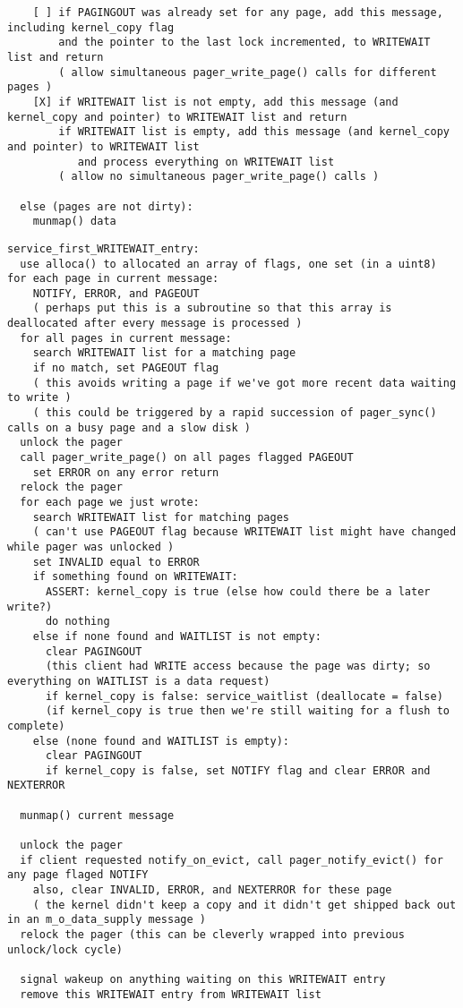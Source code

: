 \documentclass{article}
\begin{document}
\begin{verbatim}
    [ ] if PAGINGOUT was already set for any page, add this message, including kernel_copy flag
        and the pointer to the last lock incremented, to WRITEWAIT list and return
        ( allow simultaneous pager_write_page() calls for different pages )
    [X] if WRITEWAIT list is not empty, add this message (and kernel_copy and pointer) to WRITEWAIT list and return
        if WRITEWAIT list is empty, add this message (and kernel_copy and pointer) to WRITEWAIT list
           and process everything on WRITEWAIT list
        ( allow no simultaneous pager_write_page() calls )

  else (pages are not dirty):
    munmap() data
\end{verbatim}

\begin{verbatim}
service_first_WRITEWAIT_entry:
  use alloca() to allocated an array of flags, one set (in a uint8) for each page in current message:
    NOTIFY, ERROR, and PAGEOUT
    ( perhaps put this is a subroutine so that this array is deallocated after every message is processed )
  for all pages in current message:
    search WRITEWAIT list for a matching page
    if no match, set PAGEOUT flag
    ( this avoids writing a page if we've got more recent data waiting to write )
    ( this could be triggered by a rapid succession of pager_sync() calls on a busy page and a slow disk )
  unlock the pager
  call pager_write_page() on all pages flagged PAGEOUT
    set ERROR on any error return
  relock the pager
  for each page we just wrote:
    search WRITEWAIT list for matching pages
    ( can't use PAGEOUT flag because WRITEWAIT list might have changed while pager was unlocked )
    set INVALID equal to ERROR
    if something found on WRITEWAIT:
      ASSERT: kernel_copy is true (else how could there be a later write?)
      do nothing
    else if none found and WAITLIST is not empty:
      clear PAGINGOUT
      (this client had WRITE access because the page was dirty; so everything on WAITLIST is a data request)
      if kernel_copy is false: service_waitlist (deallocate = false)
      (if kernel_copy is true then we're still waiting for a flush to complete)
    else (none found and WAITLIST is empty):
      clear PAGINGOUT
      if kernel_copy is false, set NOTIFY flag and clear ERROR and NEXTERROR

  munmap() current message

  unlock the pager
  if client requested notify_on_evict, call pager_notify_evict() for any page flaged NOTIFY
    also, clear INVALID, ERROR, and NEXTERROR for these page
    ( the kernel didn't keep a copy and it didn't get shipped back out in an m_o_data_supply message )
  relock the pager (this can be cleverly wrapped into previous unlock/lock cycle)

  signal wakeup on anything waiting on this WRITEWAIT entry
  remove this WRITEWAIT entry from WRITEWAIT list
\end{verbatim}
\end{document}
